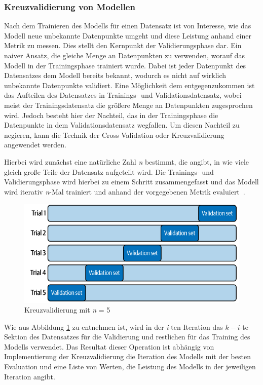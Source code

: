 \subsubsection{Kreuzvalidierung von Modellen}
Nach dem Trainieren des Modells für einen Datensatz ist von Interesse, wie das Modell neue unbekannte Datenpunkte umgeht und diese Leistung anhand einer Metrik zu messen.
Dies stellt den Kernpunkt der Validierungsphase dar. Ein naiver Ansatz, die gleiche Menge an Datenpunkten zu verwenden, worauf das Modell in der Trainingsphase trainiert wurde.
Dabei ist jeder Datenpunkt des Datensatzes dem Modell bereits bekannt, wodurch es nicht auf wirklich unbekannte Datenpunkte validiert.
Eine Möglichkeit dem entgegenzukommen ist das Aufteilen des Datensatzes in Trainings- und Validationsdatensatz, wobei meist der Trainingsdatensatz die größere Menge an Datenpunkten zugesprochen wird.
Jedoch besteht hier der Nachteil, das in der Trainingsphase die Datenpunkte in dem Validationsdatensatz wegfallen.
Um diesen Nachteil zu negieren, kann die Technik der Cross Validation oder Kreuzvalidierung angewendet werden.

Hierbei wird zunächst eine natürliche Zahl \textit{n} bestimmt, die angibt, in wie viele gleich große Teile der Datensatz aufgeteilt wird.
Die Trainings- und Validierungsphase wird hierbei zu einem Schritt zusammengefasst und das Modell wird iterativ \textit{n}-Mal trainiert und anhand der vorgegebenen Metrik evaluiert~\cite[S. 387]{10.5555/3133359}.

\begin{figure}[h]
    \centering
    \includegraphics[scale=0.5]{figures/cross_validation}
    \caption{Kreuzvalidierung mit \textit{n} = 5}
    \label{fig:cross_validation}
\end{figure}
Wie aus Abbildung \ref{fig:cross_validation} zu entnehmen ist, wird in der \textit{i}-ten Iteration das $k-i$-te Sektion des Datensatzes für die Validierung und restlichen
für das Training des Modells verwendet. Das Resultat dieser Operation ist abhängig von Implementierung der Kreuzvalidierung die Iteration des Modells mit der besten Evaluation und eine Liste von Werten, die Leistung des Modells in der jeweiligen Iteration angibt.

